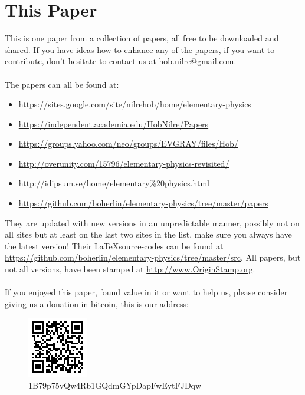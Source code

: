 \section{This Paper}

This is one paper from a collection of papers, all free to be downloaded and shared. If you have ideas how to enhance any of the papers, if you want to contribute, don’t hesitate to contact us at \url{hob.nilre@gmail.com}.\\
\\
The papers can all be found at:
\begin{itemize}
\item \url{https://sites.google.com/site/nilrehob/home/elementary-physics}
\item \url{https://independent.academia.edu/HobNilre/Papers}
\item \url{https://groups.yahoo.com/neo/groups/EVGRAY/files/Hob/}
\item \url{http://overunity.com/15796/elementary-physics-revisited/}
\item \url{http://idipsum.se/home/elementary%20physics.html}
\item \url{https://github.com/boherlin/elementary-physics/tree/master/papers}
\end{itemize}

They are updated with new versions in an unpredictable manner, possibly not on all sites but at least on the last two sites in the list, make sure you always have the latest version!
Their \LaTeX source-codes can be found at \url{https://github.com/boherlin/elementary-physics/tree/master/src}.
All papers, but not all versions, have been stamped at \url{http://www.OriginStamp.org}.\\
\\
If you enjoyed this paper, found value in it or want to help us, please consider giving us a donation in bitcoin, this is our address:

\begin{figure}[ht] \centering
	\includegraphics[]{../common/1B79p75vQw4Rb1GQdmGYpDapFwEytFJDqw} \caption{1B79p75vQw4Rb1GQdmGYpDapFwEytFJDqw}
\end{figure}
